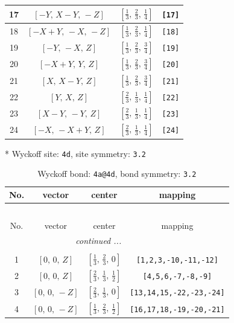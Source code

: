 \documentclass[fleqn,8pt]{jsarticle}
\begin{document}
\begin{longtable}{cccc}
17 & $\left[ - Y,\, X - Y,\, - Z \right]$ & $\left[ \frac{1}{3},\, \frac{2}{3},\, \frac{1}{4} \right]$ & {\tt [17]} \\ \hline
18 & $\left[ - X + Y,\, - X,\, - Z \right]$ & $\left[ \frac{1}{3},\, \frac{2}{3},\, \frac{1}{4} \right]$ & {\tt [18]} \\ \hline
19 & $\left[ - Y,\, - X,\, Z \right]$ & $\left[ \frac{1}{3},\, \frac{2}{3},\, \frac{3}{4} \right]$ & {\tt [19]} \\ \hline
20 & $\left[ - X + Y,\, Y,\, Z \right]$ & $\left[ \frac{1}{3},\, \frac{2}{3},\, \frac{3}{4} \right]$ & {\tt [20]} \\ \hline
21 & $\left[ X,\, X - Y,\, Z \right]$ & $\left[ \frac{1}{3},\, \frac{2}{3},\, \frac{3}{4} \right]$ & {\tt [21]} \\ \hline
22 & $\left[ Y,\, X,\, Z \right]$ & $\left[ \frac{2}{3},\, \frac{1}{3},\, \frac{1}{4} \right]$ & {\tt [22]} \\ \hline
23 & $\left[ X - Y,\, - Y,\, Z \right]$ & $\left[ \frac{2}{3},\, \frac{1}{3},\, \frac{1}{4} \right]$ & {\tt [23]} \\ \hline
24 & $\left[ - X,\, - X + Y,\, Z \right]$ & $\left[ \frac{2}{3},\, \frac{1}{3},\, \frac{1}{4} \right]$ & {\tt [24]} \\
\end{longtable}
* Wyckoff site: {\tt 4d}, site symmetry: {\tt 3.2}
\renewcommand{\arraystretch}{1.2}
\begin{longtable}{cccc}
\caption{Wyckoff bond: {\tt 4a@4d}, bond symmetry: {\tt 3.2}}
 \\
 \hline \hline
No. & vector & center & mapping \\ \hline \endfirsthead

\multicolumn{3}{l}{\tablename\ \thetable{}} \\
 \hline \hline
No. & vector & center & mapping \\ \hline \endhead

 \hline \hline
\multicolumn{3}{r}{\footnotesize\it continued ...} \\ \endfoot

 \hline \hline
\multicolumn{3}{r}{} \\ \endlastfoot

1 & $\left[ 0,\, 0,\, Z \right]$ & $\left[ \frac{1}{3},\, \frac{2}{3},\, 0 \right]$ & {\tt [1,2,3,-10,-11,-12]} \\ \hline
2 & $\left[ 0,\, 0,\, Z \right]$ & $\left[ \frac{2}{3},\, \frac{1}{3},\, \frac{1}{2} \right]$ & {\tt [4,5,6,-7,-8,-9]} \\ \hline
3 & $\left[ 0,\, 0,\, - Z \right]$ & $\left[ \frac{2}{3},\, \frac{1}{3},\, 0 \right]$ & {\tt [13,14,15,-22,-23,-24]} \\ \hline
4 & $\left[ 0,\, 0,\, - Z \right]$ & $\left[ \frac{1}{3},\, \frac{2}{3},\, \frac{1}{2} \right]$ & {\tt [16,17,18,-19,-20,-21]} \\
\end{longtable}
\end{document}
